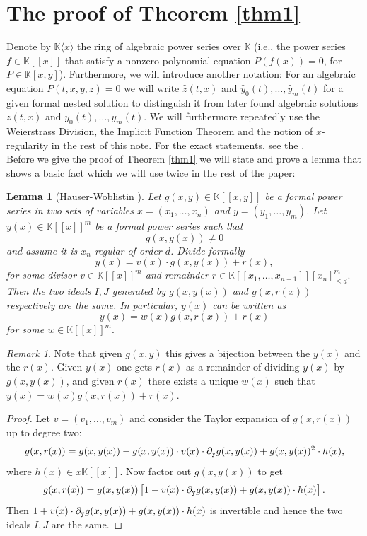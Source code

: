 \documentclass[10pt, a4paper]{article}
\def\wh{\widehat}
\newtheorem{lemma}{Lemma}[section]
\theoremstyle{remark}
\newtheorem*{remark}{Remark}
\theoremstyle{remark}
\begin{document}
\section{The proof of Theorem \ref{thm1}}\label{sec2}
Denote by $\mathbb{K}\langle x\rangle$ the ring of algebraic power series over $\mathbb{K}$ (i.e., the power series $f\in \mathbb{K}[[x]]$ that satisfy a nonzero polynomial equation $P(f(x))=0$, for $P\in\mathbb{K}[x,y]$). Furthermore, we will introduce another notation: For an algebraic equation $P(t,x,y,z)=0$ we will write $\wh{z}(t,x)$ and $\wh{y}_0(t),\ldots,\wh{y}_m(t)$ for a given formal nested solution to distinguish it from later found algebraic solutions $z(t,x)$ and $y_0(t),\ldots,y_m(t).$ We will furthermore repeatedly use the Weierstrass Division, the Implicit Function Theorem and the notion of $x$-regularity in the rest of this note. For the exact statements, see the . 
\\Before we give the proof of Theorem \ref{thm1} we will state and prove a lemma that shows a basic fact which we will use twice in the rest of the paper:
\begin{lemma}[Hauser-Woblistin \cite{Hauser_Woblistin_2021}]\label{ideale}
    Let $g(x,y)\in\mathbb{K}[[x,y]]$ be a formal power series in two sets of variables $x=(x_1,\ldots,x_n)$ and $y=(y_1,\ldots,y_m)$. Let $y(x)\in\mathbb{K}[[x]]^m$ be a formal power series such that $$g(x,y(x))\neq0$$ and assume it is $x_n$-regular of order $d$.
    Divide formally $$y(x)=v(x)\cdot g(x,y(x))+r(x),$$ for some divisor $v\in\mathbb{K}[[x]]^m$ and remainder $r\in\mathbb{K}[[x_1,\ldots,x_{n-1}]][x_n]_{\leq d}^m.$ Then the two ideals $I,J$ generated by $g(x,y(x))$ and $g(x,r(x))$ respectively are the same. In particular, $y(x)$ can be written as $$y(x)=w(x)g(x,r(x))+r(x)$$ for some $w\in\mathbb{K}[[x]]^m.$ 
\end{lemma}
\begin{remark}
    Note that given $g(x,y)$ this gives a bijection between the $y(x)$ and the $r(x).$ Given $y(x)$ one gets $r(x)$ as a remainder of dividing $y(x)$ by $g(x,y(x))$, and given $r(x)$ there exists a unique $w(x)$ such that $y(x)=w(x)g(x,r(x))+r(x)$.
\end{remark}
\begin{proof}
Let $v=(v_1,\ldots,v_m)$ and consider the Taylor expansion of $g(x,r(x))$ up to degree two:
\begin{equation}
g(x,r(x))=g(x,y(x))-g(x,y(x))\cdot v(x)\cdot\partial_{\tt{y}}g(x,y(x))+g(x,y(x))^2\cdot h(x),
\end{equation}
where $h(x)\in x\mathbb{K}[[x]]$. Now factor out $g(x,y(x))$ to get 
\begin{equation}    
g(x,r(x))=g(x,y(x))\left[1-v(x)\cdot\partial_{\tt{y}}g(x,y(x))+g(x,y(x))\cdot h(x)\right].
\end{equation}
Then $1+v(x)\cdot\partial_{\tt{y}}g(x,y(x))+g(x,y(x))\cdot h(x)$ is invertible and hence the two ideals $I,J$ are the same. 
\end{proof}
\end{document}
